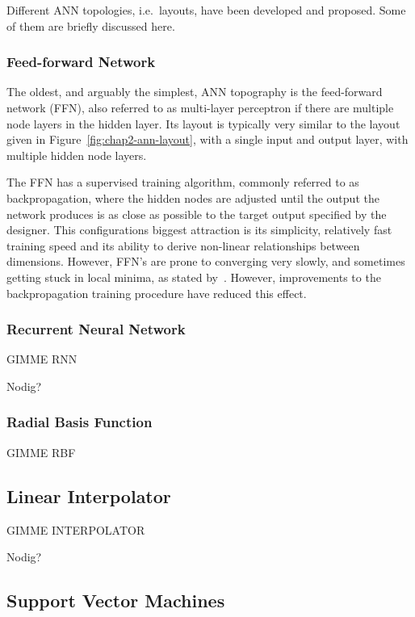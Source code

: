 Different ANN topologies, i.e.\ layouts, have been developed and proposed. Some of them are briefly discussed here.

\subsubsection{Feed-forward Network}

The oldest, and arguably the simplest, ANN topography is the feed-forward network (FFN), also referred to as multi-layer perceptron if there are multiple node layers in the hidden layer. Its layout is typically very similar to the layout given in Figure~\ref{fig:chap2-ann-layout}, with a single input and output layer, with multiple hidden node layers. 

The FFN has a supervised training algorithm, commonly referred to as backpropagation, where the hidden nodes are adjusted until the output the network produces is as close as possible to the target output specified by the designer. This configurations biggest attraction is its simplicity, relatively fast training speed and its ability to derive non-linear relationships between dimensions. However, FFN's are prone to converging very slowly, and sometimes getting stuck in local minima, as stated by~\cite{svozil1997introduction}. However, improvements to the backpropagation training procedure have reduced this effect.

\subsubsection{Recurrent Neural Network}

GIMME RNN

Nodig?

\subsubsection{Radial Basis Function}

GIMME RBF

\subsection{Linear Interpolator}

GIMME INTERPOLATOR

Nodig?

\subsection{Support Vector Machines}

